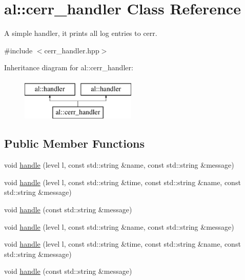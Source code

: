 \hypertarget{classal_1_1cerr__handler}{\section{al\-:\-:cerr\-\_\-handler \-Class \-Reference}
\label{classal_1_1cerr__handler}
}


\-A simple handler, it prints all log entries to cerr.  




{\ttfamily \#include $<$cerr\-\_\-handler.\-hpp$>$}

\-Inheritance diagram for al\-:\-:cerr\-\_\-handler\-:\begin{figure}[H]
\begin{center}
\leavevmode
\includegraphics[height=2.000000cm]{classal_1_1cerr__handler}
\end{center}
\end{figure}
\subsection*{\-Public \-Member \-Functions}
\begin{DoxyCompactItemize}
\item 
void \hyperlink{classal_1_1cerr__handler_aec62acaf51e9a5046ef300fe6787d1aa}{handle} (level l, const std\-::string \&name, const std\-::string \&message)
\item 
void \hyperlink{classal_1_1cerr__handler_a70dcc4ff1a54a3af30a62e70eb1ec4a5}{handle} (level l, const std\-::string \&time, const std\-::string \&name, const std\-::string \&message)
\item 
void \hyperlink{classal_1_1cerr__handler_adc5f179798baf0a4c6a53a539814b4db}{handle} (const std\-::string \&message)
\item 
void \hyperlink{classal_1_1cerr__handler_aec62acaf51e9a5046ef300fe6787d1aa}{handle} (level l, const std\-::string \&name, const std\-::string \&message)
\item 
void \hyperlink{classal_1_1cerr__handler_a70dcc4ff1a54a3af30a62e70eb1ec4a5}{handle} (level l, const std\-::string \&time, const std\-::string \&name, const std\-::string \&message)
\item 
void \hyperlink{classal_1_1cerr__handler_adc5f179798baf0a4c6a53a539814b4db}{handle} (const std\-::string \&message)
\end{DoxyCompactItemize}


